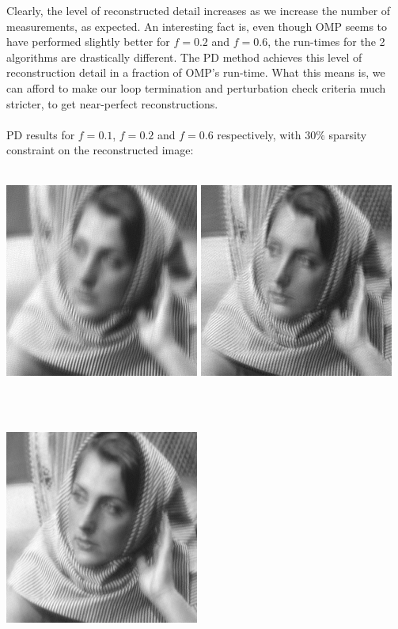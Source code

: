 \documentclass[letterpaper, 10 pt, conference]{article}
\begin{document}
Clearly, the level of reconstructed detail increases as we increase the number of measurements, as expected. An interesting fact is, even though OMP seems to have performed slightly better for $f=0.2$ and $f=0.6$, the run-times for the 2 algorithms are drastically different. The PD method achieves this level of reconstruction detail in a fraction of OMP's run-time. What this means is, we can afford to make our loop termination and perturbation check criteria much stricter, to get near-perfect reconstructions. 
\\ \\
\newpage
\noindent PD results for $f=0.1$, $f=0.2$ and $f=0.6$ respectively, with 30$\%$ sparsity constraint on the reconstructed image: \\ \\
\centerline{\includegraphics[scale=0.5]{out-PD-0_1f-0_3s-full-pc.png} \includegraphics[scale=0.5]{out-PD-0_2f-0_3s-full-pc.png}} \\ \\
\centerline{ \includegraphics[scale=0.5]{out-PD-0_6f-0_3s-full-pc.png}} \\ \\
\end{document}
